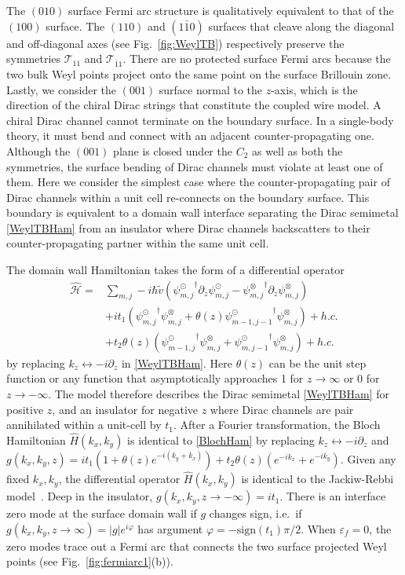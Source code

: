 The $(010)$ surface Fermi arc structure is qualitatively equivalent to that of the $(100)$ surface. The $(110)$ and $(1\bar{1}0)$ surfaces that cleave along the diagonal and off-diagonal axes (see Fig.~\ref{fig:WeylTB}) respectively preserve the \AFTR symmetries $\mathcal{T}_{11}$ and $\mathcal{T}_{\bar{1}1}$. There are no protected surface Fermi arcs because the two bulk Weyl points project onto the same point on the surface Brillouin zone. Lastly, we consider the $(001)$ surface normal to the $z$-axis, which is the direction of the chiral Dirac strings that constitute the coupled wire model. A chiral Dirac channel cannot terminate on the boundary surface. In a single-body theory, it must bend and connect with an adjacent counter-propagating one. Although the $(001)$ plane is closed under the $C_2$ as well as both the \AFTR symmetries, the surface bending of Dirac channels must violate at least one of them. Here we consider the simplest case where the counter-propagating pair of Dirac channels within a unit cell re-connects on the boundary surface. This boundary is equivalent to a domain wall interface separating the Dirac semimetal \eqref{WeylTBHam} from an insulator where Dirac channels backscatters to their counter-propagating partner within the same unit cell. 

The domain wall Hamiltonian takes the form of a differential operator
\begin{align}\hat{\mathcal{H}}=&\sum_{m,j}-i\hbar\tilde{v}\left({\psi_{m,j}^\odot}^\dagger\partial_z\psi_{m,j}^\odot-{\psi_{m,j}^\otimes}^\dagger\partial_z\psi_{m,j}^\otimes\right)\label{WeylTBHamwall}\\&+it_1\left({\psi_{m,j}^\odot}^\dagger\psi_{m,j}^\otimes+\theta(z){\psi_{m-1,j-1}^\odot}^\dagger\psi_{m,j}^\otimes\right)+h.c.\nonumber\\&+t_2\theta(z)\left({\psi_{m-1,j}^\odot}^\dagger\psi_{m,j}^\otimes+{\psi_{m,j-1}^\odot}^\dagger\psi_{m,j}^\otimes\right)+h.c.\nonumber\end{align} by replacing $k_z\leftrightarrow-i\partial_z$ in \eqref{WeylTBHam}. Here $\theta(z)$ can be the unit step function or any function that asymptotically approaches 1 for $z\to\infty$ or 0 for $z\to-\infty$. The model therefore describes the Dirac semimetal \eqref{WeylTBHam} for positive $z$, and an insulator for negative $z$ where Dirac channels are pair annihilated within a unit-cell by $t_1$. After a Fourier transformation, the Bloch Hamiltonian $\hat{H}(k_x,k_y)$ is identical to \eqref{BlochHam} by replacing $k_z\leftrightarrow-i\partial_z$ and $g(k_x,k_y,z)=it_1(1+\theta(z)e^{-i(k_y+k_x)})+t_2\theta(z)(e^{-ik_x}+e^{-ik_y})$. Given any fixed $k_x,k_y$, the differential operator $\hat{H}(k_x,k_y)$ is identical to the Jackiw-Rebbi model~\cite{JackiwRebbi76}. Deep in the insulator, $g(k_x,k_y,z\to-\infty)=it_1$. There is an interface zero mode at the surface domain wall if $g$ changes sign, i.e.~if $g(k_x,k_y,z\to\infty)=|g|e^{i\varphi}$ has argument $\varphi=-\mathrm{sign}(t_1)\pi/2$. When $\varepsilon_f=0$, the zero modes trace out a Fermi arc that connects the two surface projected Weyl points (see Fig.~\ref{fig:fermiarc1}(b)).

